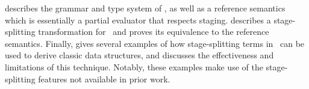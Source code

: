  describes the grammar and type system of \lang, as well as a reference semantics which is essentially a partial evaluator that respects staging.  describes a stage-splitting transformation for \lang\ and proves its equivalence to the reference semantics.
Finally,  gives several examples of how stage-splitting terms in \lang\ can be used to derive classic data structures, and discusses the effectiveness and limitations of this technique.  Notably, these examples make use of the stage-splitting features not available in prior work.



